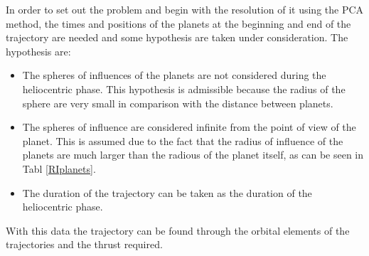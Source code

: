 In order to set out the problem and begin with the resolution of it using the PCA method, the times and positions of the planets at the beginning and end of the trajectory are needed and some hypothesis are taken under consideration. The hypothesis are: 
\begin{itemize}
\item The spheres of influences of the planets are not considered during the heliocentric phase. This hypothesis is admissible because the radius of the sphere are very small in comparison with the distance between planets.
\item The spheres of influence are considered infinite from the point of view of the planet. This is assumed due to the fact that the radius of influence of the planets are much larger than the radious of the planet itself, as can be seen in Tabl \ref{RIplanets}.
\item The duration of the trajectory can be taken as the duration of the heliocentric phase. 
\end{itemize}
 With this data the trajectory can be found through the orbital elements of the trajectories and the thrust required. 



 